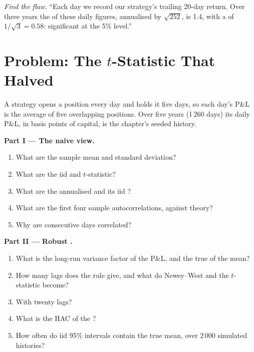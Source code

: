 \begin{exercise}[$\star\star\star$]\label{exo:qm:estimation:8}
\emph{Find the flaw.} ``Each day we record our strategy's trailing 20-day return. Over three years the  of these
daily figures, annualised by $\sqrt{252}$, is 1.4, with a  of $1/\sqrt3 = 0.58$: significant at the 5\% level.''
\end{exercise}

\section{Problem: The $t$-Statistic That Halved}

\begin{problem}\label{pb:qm:estimation:1}
A strategy opens a position every day and holds it five days, so each day's P\&L is the average of five overlapping positions.
Over five years (1\,260 days) its daily P\&L, in basis points of capital, is the chapter's seeded history.

\medskip\noindent\textbf{Part I --- The naive view.}
\begin{enumerate}
\item What are the sample mean and standard deviation?
\item What are the iid  and $t$-statistic?
\item What are the annualised  and its iid ?
\item What are the first four sample autocorrelations, against theory?
\item Why are consecutive days correlated?
\end{enumerate}

\medskip\noindent\textbf{Part II --- Robust .}
\begin{enumerate}[resume]
\item What is the long-run variance factor of the P\&L, and the true  of the mean?
\item How many lags does the rule give, and what do Newey--West and the $t$-statistic become?
\item With twenty lags?
\item What is the HAC  of the ?
\item How often do iid 95\% intervals contain the true mean, over 2\,000 simulated histories?
\end{enumerate}


\end{problem}
